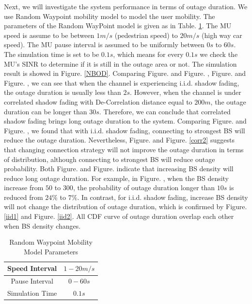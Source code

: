\documentclass[journal,comsoc]{IEEEtran}
\begin{document}
\par Next, we will investigate the system performance in terms of outage duration. We use Random Waypoint mobility model to model the user mobility. The parameters of the Random WayPoint model is given as in Table. \ref{RWP}. The MU speed is assume to be between $1m/s$ (pedestrian speed) to $20m/s$ (high way car speed). The MU pause interval is assumed to be uniformly between $0s$ to $60s$. The simulation time is set to be $0.1s$, which means for every $0.1s$ we check the MU's SINR to determine if it is still in the outage area or not.  The simulation result is showed in Figure. \ref{NBOD}. Comparing Figure.  and Figure. , Figure.  and Figure. , we can see that when the channel is experiencing i.i.d. shadow fading, the outage duration is usually less than $2s$. However,  when the channel is under correlated shadow fading with De-Correlation distance equal to $200m$, the outage duration can be longer than $30s$. Therefore, we can conclude that correlated shadow fading brings long outage duration to the system. Comparing Figure.  and Figure. , we found that with i.i.d. shadow fading, connecting to strongest BS will reduce the outage duration.  Nevertheless, Figure.  and Figure. \ref{corr2} suggests that changing connection strategy will not improve the outage duration in terms of distribution, although connecting to strongest BS will reduce outage probability. Both Figure.  and Figure.  indicate that increasing BS density will reduce long outage duration. For example, in Figure. , when the BS density increase from $50$ to $300$, the probability of outage duration longer than $10s$ is reduced from $24\%$ to $7\%$. In contrast, for i.i.d. shadow fading, increase BS density will not change the distribution of outage duration, which is confirmed by Figure. \ref{iid1} and Figure. \ref{iid2}. All CDF curve of outage duration overlap each other when BS density changes. 
\begin{table}
\centering
\caption{\label{RWP}Random Waypoint Mobility Model Parameters}

\begin{tabular}{|c|c|}

\hline
Speed Interval & $1 - 20m/s$\\
\hline
Pause Interval & $0 - 60s$\\
\hline
Simulation Time & $0.1s$\\
\hline
\end{tabular}

\end{table}
\end{document}

